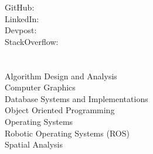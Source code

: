 \documentclass[]{hackathons}
\begin{document}
\begin{minipage}[t]{0.38\textwidth} 


GitHub: \href{https://github.com/adriandarian}{} \\
LinkedIn: \href{https://www.linkedin.com/in/adriandarian}{} \\
Devpost: \href{https://www.devpost.com/adarian}{} \\
StackOverflow: \href{https://stackoverflow.com/users/9647369/adarian}{} \\


\section{}

\small


\section{}
Algorithm Design and Analysis \\
Computer Graphics \\
Database Systems and Implementations \\
Object Oriented Programming \\
Operating Systems \\
Robotic Operating Systems (ROS) \\
Spatial Analysis \\
\small



\end{minipage}
\end{document}
